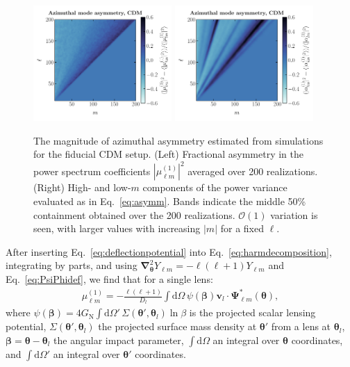 \documentclass[prd,aps,10pt,nofootinbib,twocolumn,superscriptaddress,preprintnumbers,balancelastpage,longbibliography]{revtex4-1}
\newcommand{\vect}[1]{\boldsymbol{\mathbf{#1}}}
\newcommand{\dd}{\mathrm{d}}
\newcommand{\ellm}{{\ell m}}
\newcommand{\GN}{G_\mathrm{N}}
\begin{document}
\begin{figure}[!htbp]
  \centering
  \includegraphics[width=0.47\textwidth]{plots/m_asymm_1}
  \includegraphics[width=0.47\textwidth]{plots/m_asymm_alpha_1}
  \caption{The magnitude of azimuthal asymmetry estimated from simulations for the fiducial CDM setup. (Left) Fractional asymmetry in the power spectrum coefficients $|\mu_\ellm^{(1)}|^2$ averaged over 200 realizations. (Right) High- and low-$m$ components of the power variance evaluated as in Eq.~\ref{eq:asymm}. Bands indicate the middle 50\% containment obtained over the 200 realizations.  $\mathcal{O}(1)$ variation is seen, with larger values with increasing $|m|$ for a fixed $\ell$.}
  \label{fig:m_asymm}
\end{figure}

After inserting Eq.~\ref{eq:deflectionpotential} into Eq.~\ref{eq:harmdecomposition}, integrating by parts, and using $\vect{\nabla}_{\vect{\theta}}^2 Y_{\ell m} = - \ell (\ell + 1) Y_{\ell m}$ and Eq.~\ref{eq:PsiPhidef}, we find that for a single lens:
\begin{align}
\mu_{\ell m}^{(1)} = - \frac{\ell (\ell + 1)}{D_l} \int \dd \Omega \, \psi(\vect{\beta}) \vect{v}_l \cdot \vect{\Psi}_{\ell m}^*(\vect{\theta}),
\end{align}
where $\psi(\vect{\beta}) = 4 \GN \int \dd \Omega' \, \Sigma(\vect{\theta}',\vect{\theta}_l) \ln \beta$ is the projected scalar lensing potential, $\Sigma(\vect{\theta}', \vect{\theta}_l)$ the projected surface mass density at $\vect{\theta}'$ from a lens at $\vect{\theta}_l$, $\vect{\beta} = \vect{\theta} - \vect{\theta}_l$ the angular impact parameter, $\int \dd \Omega$ an integral over $\vect{\theta}$ coordinates, and $\int \dd \Omega'$ an integral over $\vect{\theta}'$ coordinates.
\end{document}
